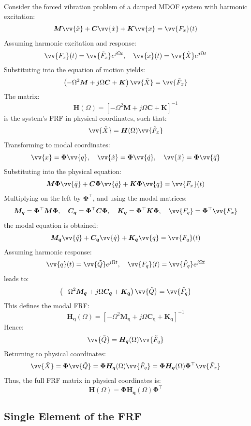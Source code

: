 Consider the forced vibration problem of a damped MDOF system with harmonic excitation:
\[
\boldsymbol{M} \vv{\ddot{x}} + \boldsymbol{C} \vv{\dot{x}} + \boldsymbol{K} \vv{x} = \vv{F_x}(t)
\]
Assuming harmonic excitation and response:
\[
\vv{F_x}(t) = \vv{\tilde{F}_x} e^{j \Omega t}, \quad \vv{x}(t) = \vv{\tilde{X}} e^{j \Omega t}
\]
Substituting into the equation of motion yields:
\[
\left( -\Omega^2 \boldsymbol{M} + j \Omega \boldsymbol{C} + \boldsymbol{K} \right) \vv{\tilde{X}} = \vv{\tilde{F}_x}
\]
The matrix:
\[
\boldsymbol{H}(\Omega) = \left[ -\Omega^2 \boldsymbol{M} + j \Omega \boldsymbol{C} + \boldsymbol{K} \right]^{-1}
\]
is the system's FRF in physical coordinates, such that:
\[
\vv{\tilde{X}} = \boldsymbol{H}(\Omega) \vv{\tilde{F}_x}
\]
Transforming to modal coordinates:
\[
\vv{x} = \boldsymbol{\Phi} \vv{q}, \quad \vv{\dot{x}} = \boldsymbol{\Phi} \vv{\dot{q}}, \quad \vv{\ddot{x}} = \boldsymbol{\Phi} \vv{\ddot{q}}
\]
Substituting into the physical equation:
\[
\boldsymbol{M} \boldsymbol{\Phi} \vv{\ddot{q}} + \boldsymbol{C} \boldsymbol{\Phi} \vv{\dot{q}} + \boldsymbol{K} \boldsymbol{\Phi} \vv{q} = \vv{F_x}(t)
\]
Multiplying on the left by \( \boldsymbol{\Phi}^\top \), and using the modal matrices:
\[
\boldsymbol{M_q} = \boldsymbol{\Phi}^\top \boldsymbol{M} \boldsymbol{\Phi}, \quad
\boldsymbol{C_q} = \boldsymbol{\Phi}^\top \boldsymbol{C} \boldsymbol{\Phi}, \quad
\boldsymbol{K_q} = \boldsymbol{\Phi}^\top \boldsymbol{K} \boldsymbol{\Phi}, \quad
\vv{F_q} = \boldsymbol{\Phi}^\top \vv{F_x}
\]
the modal equation is obtained:
\[
\boldsymbol{M_q} \vv{\ddot{q}} + \boldsymbol{C_q} \vv{\dot{q}} + \boldsymbol{K_q} \vv{q} = \vv{F_q}(t)
\]
Assuming harmonic response:
\[
\vv{q}(t) = \vv{\tilde{Q}} e^{j \Omega t}, \quad \vv{F_q}(t) = \vv{\tilde{F}_q} e^{j \Omega t}
\]
leads to:
\[
\left( -\Omega^2 \boldsymbol{M_q} + j \Omega \boldsymbol{C_q} + \boldsymbol{K_q} \right) \vv{\tilde{Q}} = \vv{\tilde{F}_q}
\]
This defines the modal FRF:
\[
\boldsymbol{H_q}(\Omega) = \left[ -\Omega^2 \boldsymbol{M_q} + j \Omega \boldsymbol{C_q} + \boldsymbol{K_q} \right]^{-1}
\]
Hence:
\[
\vv{\tilde{Q}} = \boldsymbol{H_q}(\Omega) \vv{\tilde{F}_q}
\]
Returning to physical coordinates:
\[
\vv{\tilde{X}} = \boldsymbol{\Phi} \vv{\tilde{Q}} = \boldsymbol{\Phi} \boldsymbol{H_q}(\Omega) \vv{\tilde{F}_q} = \boldsymbol{\Phi} \boldsymbol{H_q}(\Omega) \boldsymbol{\Phi}^\top \vv{\tilde{F}_x}
\]
Thus, the full FRF matrix in physical coordinates is:
\[
\boldsymbol{H}(\Omega) = \boldsymbol{\Phi} \boldsymbol{H_q}(\Omega) \boldsymbol{\Phi}^\top
\]

\subsection{Single Element of the FRF}

